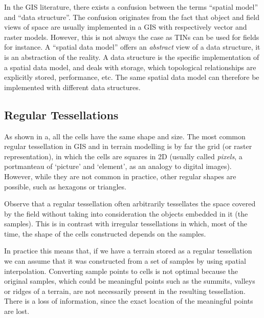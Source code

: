 In the GIS literature, there exists a confusion between the terms ``spatial model'' and ``data structure''. 
The confusion originates from the fact that object and field views of space are usually implemented in a GIS with respectively vector and raster models. 
However, this is not always the case as TINs can be used for fields for instance.
A ``spatial data model'' offers an \emph{abstract} view of a data structure, it is an abstraction of the reality.
A data structure is the specific implementation of a spatial data model, and deals with storage, which topological relationships are explicitly stored, performance, etc.
The same spatial data model can therefore be implemented with different data structures.



\subsection{Regular Tessellations} 

As shown in a, all the cells have the same shape and size.
The most common regular tessellation in GIS and in terrain modelling is by far the grid (or raster representation), in which the cells are squares in 2D (usually called \emph{pixels}, a portmanteau of `picture' and `element', as an analogy to digital images).
However, while they are not common in practice, other regular shapes are possible, such as hexagons or triangles.

%

Observe that a regular tessellation often arbitrarily tessellates the space covered by the field without taking into consideration the objects embedded in it (the samples). 
This is in contrast with irregular tessellations in which, most of the time, the shape of the cells constructed depends on the samples.

In practice this means that, if we have a terrain stored as a regular tessellation we can assume that it was constructed from a set of samples by using spatial interpolation.
Converting sample points to cells is not optimal because the original samples, which could be meaningful points such as the summits, valleys or ridges of a terrain, are not necessarily present in the resulting tessellation. 
There is a loss of information, since the exact location of the meaningful points are lost.

